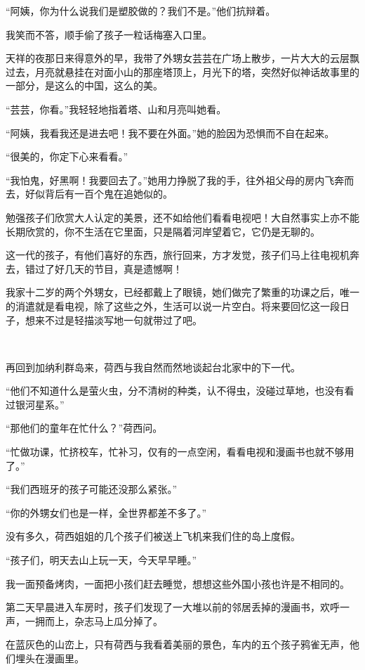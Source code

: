 \par “阿姨，你为什么说我们是塑胶做的？我们不是。”他们抗辩着。
\par 我笑而不答，顺手偷了孩子一粒话梅塞入口里。
\par 天祥的夜那日来得意外的早，我带了外甥女芸芸在广场上散步，一片大大的云层飘过去，月亮就悬挂在对面小山的那座塔顶上，月光下的塔，突然好似神话故事里的一部分，是这么的中国，这么的美。
\par “芸芸，你看。”我轻轻地指着塔、山和月亮叫她看。
\par “阿姨，我看我还是进去吧！我不要在外面。”她的脸因为恐惧而不自在起来。
\par “很美的，你定下心来看看。”
\par “我怕鬼，好黑啊！我要回去了。”她用力挣脱了我的手，往外祖父母的房内飞奔而去，好似背后有一百个鬼在追她似的。
\par 勉强孩子们欣赏大人认定的美景，还不如给他们看看电视吧！大自然事实上亦不能长期欣赏的，你不生活在它里面，只是隔着河岸望着它，它仍是无聊的。
\par 这一代的孩子，有他们喜好的东西，旅行回来，方才发觉，孩子们马上往电视机奔去，错过了好几天的节目，真是遗憾啊！
\par 我家十二岁的两个外甥女，已经都戴上了眼镜，她们做完了繁重的功课之后，唯一的消遣就是看电视，除了这些之外，生活可以说一片空白。将来要回忆这一段日子，想来不过是轻描淡写地一句就带过了吧。
\par  
\par 再回到加纳利群岛来，荷西与我自然而然地谈起台北家中的下一代。
\par “他们不知道什么是萤火虫，分不清树的种类，认不得虫，没碰过草地，也没有看过银河星系。”
\par “那他们的童年在忙什么？”荷西问。
\par “忙做功课，忙挤校车，忙补习，仅有的一点空闲，看看电视和漫画书也就不够用了。”
\par “我们西班牙的孩子可能还没那么紧张。”
\par “你的外甥女们也是一样，全世界都差不多了。”
\par 没有多久，荷西姐姐的几个孩子们被送上飞机来我们住的岛上度假。
\par “孩子们，明天去山上玩一天，今天早早睡。”
\par 我一面预备烤肉，一面把小孩们赶去睡觉，想想这些外国小孩也许是不相同的。
\par 第二天早晨进入车房时，孩子们发现了一大堆以前的邻居丢掉的漫画书，欢呼一声，一拥而上，杂志马上瓜分掉了。
\par 在蓝灰色的山峦上，只有荷西与我看着美丽的景色，车内的五个孩子鸦雀无声，他们埋头在漫画里。
